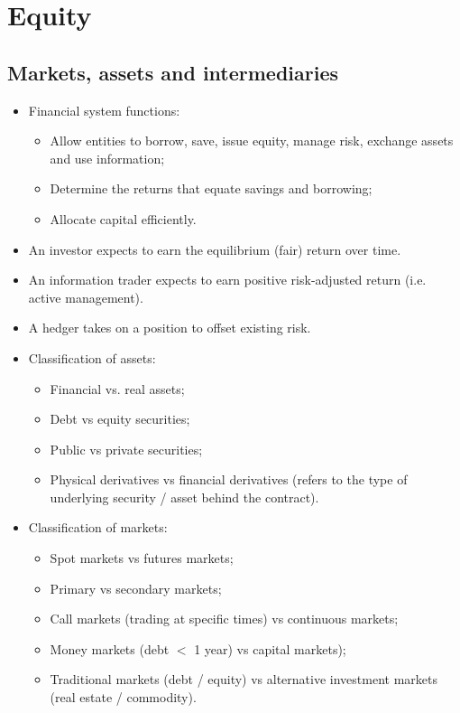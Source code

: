 \documentclass[../notes_compiled.tex]{subfiles}
\begin{document}
\section{Equity}
\subsection{Markets, assets and intermediaries}
\begin{itemize}
\item Financial system functions:
\begin{itemize}
\item Allow entities to borrow, save, issue equity, manage risk, exchange assets and use information;
\item Determine the returns that equate savings and borrowing;
\item Allocate capital efficiently.
\end{itemize}
\item An investor expects to earn the equilibrium (fair) return over time.
\item An information trader expects to earn positive risk-adjusted return (i.e. active management).
\item A hedger takes on a position to offset existing risk.

\item Classification of assets:
\begin{itemize}
\item Financial vs. real assets;
\item Debt vs equity securities;
\item Public vs private securities;
\item Physical derivatives vs financial derivatives (refers to the type of underlying security / asset behind the contract).
\end{itemize}

\item Classification of markets:
\begin{itemize}
\item Spot markets vs futures markets;
\item Primary vs secondary markets;
\item Call markets (trading at specific times) vs continuous markets;
\item Money markets (debt $<$ 1 year) vs capital markets);
\item Traditional markets (debt / equity) vs alternative investment markets (real estate / commodity).
\end{itemize}


\end{itemize}
\end{document}
